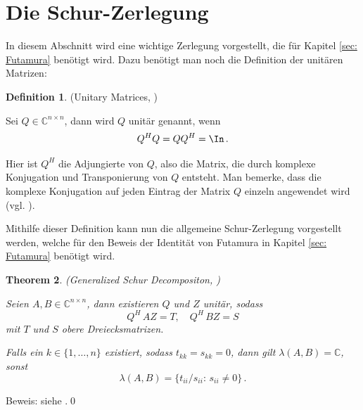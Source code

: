 \documentclass[a4paper,12pt]{report}
\newcommand{\C}{\mathbb C}
\newcommand{\1}{\mathds{1}}
\theoremstyle{plain} %
\newtheorem{theorem}{Theorem}
\theoremstyle{definition} %
\newtheorem{definition}[theorem]{Definition}
\theoremstyle{remark}
\begin{document}
      \section{Die Schur-Zerlegung}
            In diesem Abschnitt wird eine wichtige Zerlegung vorgestellt, die für Kapitel \ref{sec: Futamura} benötigt wird.
            Dazu benötigt man noch die Definition der unitären Matrizen:
            \begin{definition}(Unitary Matrices, \cite[S. 73]{matrixGolub})

                  Sei $Q \in\C^{n\times n}$, dann wird $Q$ unitär genannt, wenn
                  $$Q^HQ = QQ^H=\In\, .$$
            \end{definition}

            Hier ist $Q^H$ die Adjungierte von $Q$, also die Matrix, die durch komplexe Konjugation und Transponierung von $Q$ entsteht.
            Man bemerke, dass die komplexe Konjugation auf jeden Eintrag der Matrix $Q$ einzeln angewendet wird (vgl. \cite[S. 14]{matrixGolub}).

            Mithilfe dieser Definition kann nun die allgemeine Schur-Zerlegung vorgestellt werden, welche für den Beweis der Identität von Futamura
            in Kapitel \ref{sec: Futamura} benötigt wird.
            \begin{theorem}(Generalized Schur Decompositon, \cite[S. 377]{matrixGolub})
                  \label{thrm: allg Schur Zerlegung}

                  Seien $A, B \in \C^{n\times n}$, dann existieren $Q$ und $Z$ unitär, sodass
                  \begin{equation}
                        \label{eqn: allg Schur_Resultat}
                        Q^H\,AZ = T,\quad Q^H\, BZ = S
                  \end{equation}
                  mit $T$ und $S$ obere Dreiecksmatrizen.

                  Falls ein $k\in \{1,\dots, n\}$ existiert, sodass $t_{kk}=s_{kk}=0$, dann gilt $\lambda(A, B) = \C$, sonst
                  \begin{equation}
                        \label{eqn: EW Pencil nach Schur}
                        \lambda(A, B) = \{t_{ii}/s_{ii}:\, s_{ii}\ne 0\}\, .
                  \end{equation}
            \end{theorem}
            Beweis: siehe \cite[S. 377]{matrixGolub}.\qed
      
\end{document}
